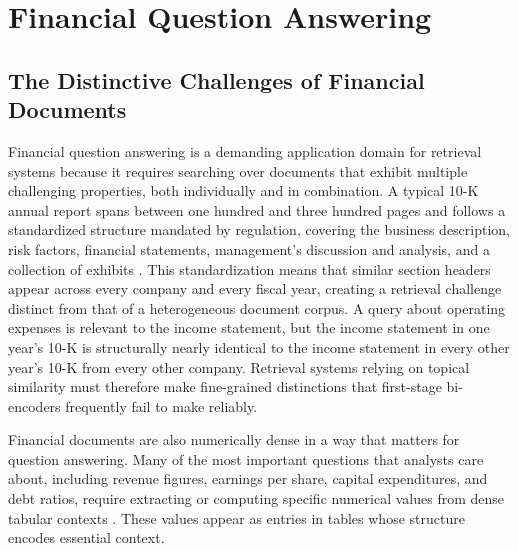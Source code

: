 \documentclass[12pt,twoside,maitrise]{dms}
\theoremstyle{definition}
\numberwithin{equation}{section}
\numberwithin{table}{chapter}
\numberwithin{figure}{chapter}
\begin{document}


\section{Financial Question Answering}
\label{sec:finqa}

\subsection{The Distinctive Challenges of Financial Documents}

Financial question answering is a demanding application domain for retrieval
systems because it requires searching over documents that exhibit multiple
challenging properties, both individually and in combination. A typical 10-K annual report spans between one hundred and three
hundred pages and follows a standardized structure mandated by regulation, covering the
business description, risk factors, financial statements, management's discussion and
analysis, and a collection of exhibits \citep{islam2023financebench}. This standardization means that similar section
headers appear across every company and every fiscal year, creating a retrieval challenge
distinct from that of a heterogeneous document corpus. A query about operating expenses
is relevant to the income statement, but the income statement in one year's 10-K is
structurally nearly identical to the income statement in every other year's 10-K from
every other company. Retrieval systems relying on topical similarity must therefore make
fine-grained distinctions that first-stage bi-encoders frequently fail to make reliably.

Financial documents are also numerically dense in a way that matters for question
answering. Many of the most important questions that analysts care about, including
revenue figures, earnings per share, capital expenditures, and debt ratios, require
extracting or computing specific numerical values from dense tabular contexts \citep{chen2021finqa}. These
values appear as entries in tables whose structure encodes essential context.
\end{document}
